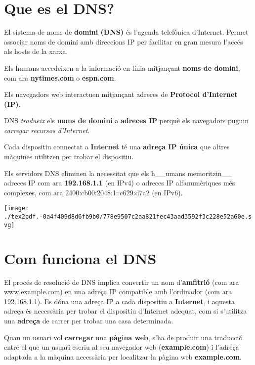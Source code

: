 \documentclass[]{article}
\begin{document}
\hypertarget{que-es-el-dns}{%
\section{\texorpdfstring{\textbf{Que es el
DNS?}}{Que es el DNS?}}\label{que-es-el-dns}}

El sistema de noms de \textbf{domini (DNS)} és l'agenda telefònica
d'Internet. Permet associar noms de domini amb direccions IP per
facilitar en gran mesura l'accés als hosts de la xarxa.

Els humans accedeixen a la informació en línia mitjançant \textbf{noms
de domini}, com ara \textbf{nytimes.com} o \textbf{espn.com}.

Els navegadors web interactuen mitjançant adreces de \textbf{Protocol
d'Internet (IP)}.

DNS \emph{tradueix} els \textbf{noms de domini} a \textbf{adreces IP}
perquè els navegadors puguin \emph{carregar recursos d'Internet}.

Cada dispositiu connectat a \textbf{Internet} té una \textbf{adreça IP
única} que altres màquines utilitzen per trobar el dispositiu.

Els servidors DNS eliminen la necessitat que els h\_\_umans
memoritzin\_\_ adreces IP com ara \textbf{192.168.1.1} (en IPv4) o
adreces IP alfanumèriques més complexes, com ara
2400:cb00:2048:1::c629:d7a2 (en IPv6).

\texttt{[image: ./tex2pdf.-0a4f409d8d6fb9b0/778e9507c2aa821fec43aad3592f3c228e52a60e.svg]}

\hypertarget{com-funciona-el-dns}{%
\section{\texorpdfstring{\textbf{Com funciona el
DNS}}{Com funciona el DNS}}\label{com-funciona-el-dns}}

El procés de resolució de DNS implica convertir un nom
d'\textbf{amfitrió} (com ara www.example.com) en una adreça IP
compatible amb l'ordinador (com ara 192.168.1.1). Es dóna una adreça IP
a cada dispositiu a \textbf{Internet}, i aquesta adreça és necessària
per trobar el dispositiu d'Internet adequat, com si s'utilitza una
\textbf{adreça} de carrer per trobar una casa determinada.

Quan un usuari vol \textbf{carregar} una \textbf{pàgina web}, s'ha de
produir una traducció entre el que un usuari escriu al seu navegador web
(\textbf{example.com}) i l'adreça adaptada a la màquina necessària per
localitzar la pàgina web \textbf{example.com}.
\end{document}
